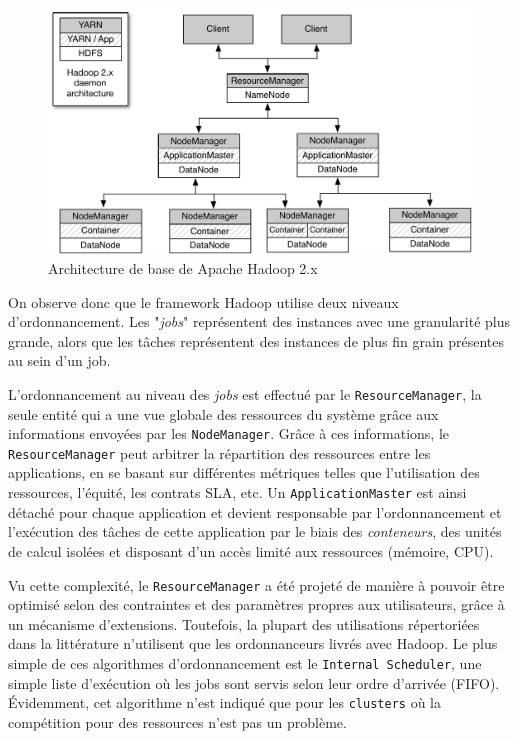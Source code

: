 \begin{figure}[!ht]
	\centering
	\includegraphics[width=0.85\linewidth]{img/HadoopArch.pdf}
	\caption{Architecture de base de Apache Hadoop 2.x}
	\label{fig:ArquiteturaHadoop}
\end{figure}


On observe donc que le framework Hadoop utilise deux niveaux d'ordonnancement. Les "\textit{jobs}" représentent des instances avec une granularité plus grande, alors que les tâches représentent des instances de plus fin grain présentes au sein d'un job. 

L'ordonnancement au niveau des \textit{jobs} est effectué par le \texttt{ResourceManager}, la seule entité qui a une vue globale des ressources du système grâce aux informations envoyées par les \texttt{NodeManager}. Grâce à ces informations, le \texttt{ResourceManager} peut arbitrer la répartition des ressources entre les applications, en se basant sur différentes métriques telles que l'utilisation des ressources, l'équité, les contrats SLA, etc. Un \texttt{ApplicationMaster} est ainsi détaché pour chaque application et devient responsable par l'ordonnancement et l'exécution des tâches de cette application par le biais des \textit{conteneurs}, des unités de calcul isolées et disposant d'un accès limité aux ressources (mémoire, CPU). 

Vu cette complexité, le \texttt{ResourceManager} a été projeté de manière à pouvoir être optimisé selon des contraintes et des paramètres propres aux utilisateurs, grâce à un mécanisme d'extensions. Toutefois, la plupart des utilisations répertoriées dans la littérature n'utilisent que les ordonnanceurs livrés avec Hadoop. Le plus simple de ces algorithmes d'ordonnancement est le \texttt{Internal Scheduler}, une simple liste d'exécution où les jobs sont servis selon leur ordre d'arrivée (FIFO). Évidemment, cet algorithme n'est indiqué que pour les \texttt{clusters} où la compétition pour des ressources n'est pas un problème. 


